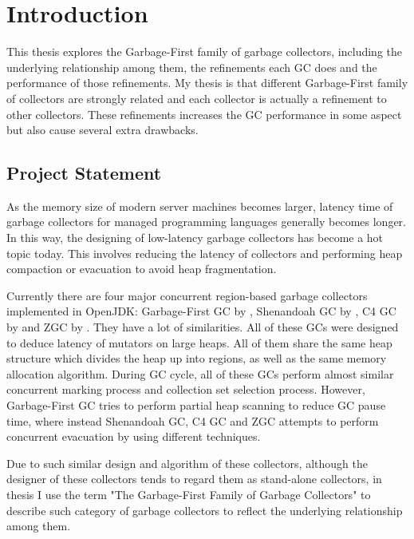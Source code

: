 \chapter{Introduction}
\label{cha:intro}

This thesis explores the Garbage-First family of garbage collectors, including
the underlying relationship among them, the refinements each GC does and the performance
of those refinements.
My thesis is that different Garbage-First family of collectors are strongly related
and each collector is actually a refinement to other collectors.
These refinements increases the GC performance in some aspect but also cause several extra drawbacks.

\section{Project Statement}

As the memory size of modern server machines becomes larger, latency time of
garbage collectors for managed programming languages generally becomes longer.
In this way, the designing of low-latency garbage collectors has become
a hot topic today. This involves reducing the latency of collectors and
performing heap compaction or evacuation to avoid heap fragmentation.

Currently there are four major concurrent region-based garbage collectors implemented in OpenJDK:
Garbage-First GC by \cite{detlefs2004garbage}, Shenandoah GC by \cite{flood2016shenandoah}, C4 GC by \cite{tene2011c4}
and ZGC by \cite{liden_karlsson_2018}.
They have a lot of similarities.
All of these GCs were designed to deduce latency of mutators on large heaps.
All of them share the same heap structure which divides the heap up into regions,
as well as the same memory allocation algorithm.
During GC cycle, all of these GCs perform almost similar concurrent marking process and collection
set selection process.
However, Garbage-First GC tries to perform partial heap scanning to reduce GC pause time,
where instead Shenandoah GC, C4 GC and ZGC attempts to perform concurrent evacuation by using different
techniques.

Due to such similar design and algorithm of these collectors, although the designer
of these collectors tends to regard them as stand-alone collectors, in thesis I
use the term "The Garbage-First Family of Garbage Collectors" to describe
such category of garbage collectors to reflect the underlying relationship among them.

